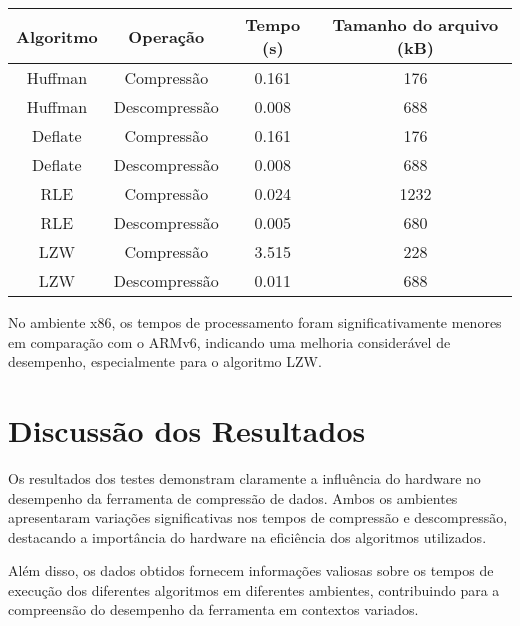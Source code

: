 \begin{center}
\begin{tabular}{|c|c|c|c|}
\hline
Algoritmo & Operação & Tempo (s) & Tamanho do arquivo (kB) \\
\hline
Huffman & Compressão & 0.161 & 176 \\
Huffman & Descompressão & 0.008 & 688 \\
Deflate & Compressão & 0.161 & 176 \\
Deflate & Descompressão & 0.008 & 688 \\
RLE & Compressão & 0.024 & 1232 \\
RLE & Descompressão & 0.005 & 680 \\
LZW & Compressão & 3.515 & 228 \\
LZW & Descompressão & 0.011 & 688 \\
\hline
\end{tabular}
\end{center}

No ambiente x86, os tempos de processamento foram significativamente menores em comparação com o ARMv6, indicando uma melhoria considerável de desempenho, especialmente para o algoritmo LZW.

\section{Discussão dos Resultados}

Os resultados dos testes demonstram claramente a influência do hardware no desempenho da ferramenta de compressão de dados. Ambos os ambientes apresentaram variações significativas nos tempos de compressão e descompressão, destacando a importância do hardware na eficiência dos algoritmos utilizados.

Além disso, os dados obtidos fornecem informações valiosas sobre os tempos de execução dos diferentes algoritmos em diferentes ambientes, contribuindo para a compreensão do desempenho da ferramenta em contextos variados.
